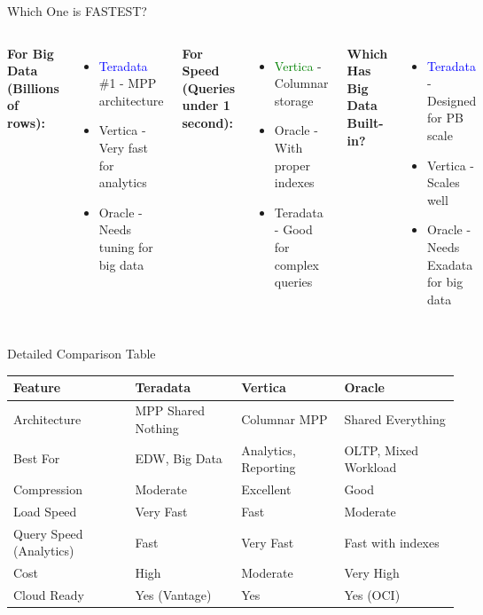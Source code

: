 \documentclass{beamer}
\begin{document}
	\begin{frame}{Which One is FASTEST?}
		\begin{columns}[T]
			\textbf{For Big Data (Billions of rows):}
			\begin{itemize}
				\item \textcolor{blue}{Teradata} \#1 - MPP architecture
				\item Vertica - Very fast for analytics
				\item Oracle - Needs tuning for big data
			\end{itemize}
			
			\vspace{0.3cm}
			\textbf{For Speed (Queries under 1 second):}
			\begin{itemize}
				\item \textcolor{green}{Vertica} - Columnar storage
				\item Oracle - With proper indexes
				\item Teradata - Good for complex queries
			\end{itemize}
			
			\textbf{Which Has Big Data Built-in?}
			\begin{itemize}
				\item \textcolor{blue}{Teradata} - Designed for PB scale
				\item Vertica - Scales well
				\item Oracle - Needs Exadata for big data
			\end{itemize}
		\end{columns}
	\end{frame}
	
	\begin{frame}{Detailed Comparison Table}
		\begin{table}
			\tiny
			\begin{tabular}{|p{}|p{0.24\textwidth}|p{}|p{}|}
				\hline
				\textbf{Feature} & \textbf{Teradata} & \textbf{Vertica} & \textbf{Oracle} \\
				\hline
				Architecture & MPP Shared Nothing & Columnar MPP & Shared Everything \\
				\hline
				Best For & EDW, Big Data & Analytics, Reporting & OLTP, Mixed Workload \\
				\hline
				Compression & Moderate & Excellent & Good \\
				\hline
				Load Speed & Very Fast & Fast & Moderate \\
				\hline
				Query Speed (Analytics) & Fast & Very Fast & Fast with indexes \\
				\hline
				Cost & High & Moderate & Very High \\
				\hline
				Cloud Ready & Yes (Vantage) & Yes & Yes (OCI) \\
				\hline
			\end{tabular}
		\end{table}
	\end{frame}
	
\end{document}
